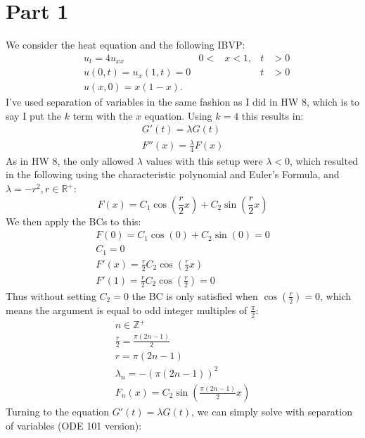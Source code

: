 \documentclass{article}
\begin{document}
\section*{Part 1}
We consider the heat equation and the following IBVP:
\begin{align*}
&u_t=4u_{xx} & 0<&x<1, & t&> 0\\
&u(0, t)= u_x(1, t) = 0 && & t&> 0\\
&u(x,0)= x(1-x). && &&
\end{align*}
I've used separation of variables in the same fashion as I did in HW 8, which is to say I put the $k$ term with the $x$ equation. Using $k = 4$ this results in:
\begin{equation}
\begin{aligned}
G'(t) = \lambda G(t)\\
F''(x) = \frac{\lambda}{4}F(x)
\end{aligned}
\end{equation}
As in HW 8, the only allowed $\lambda$ values with this setup were $\lambda < 0$, which resulted in the following using the characteristic polynomial and Euler's Formula, and $\lambda = -r^2, r \in \mathbb{R}^+$:
\begin{equation}
F(x) = C_1\cos(\frac{r}{2}x) + C_2\sin(\frac{r}{2}x)
\end{equation}
We then apply the BCs to this:
\begin{equation}
\begin{aligned}
F(0) = C_1\cos(0) + C_2\sin(0) = 0\\
C_1 = 0\\
F'(x) = \frac{r}{2}C_2\cos(\frac{r}{2}x)\\
F'(1) = \frac{r}{2}C_2\cos(\frac{r}{2}) = 0
\end{aligned}
\end{equation}
Thus without setting $C_2 = 0$ the BC is only satisfied when $\cos(\frac{r}{2}) = 0$, which means the argument is equal to odd integer multiples of $\frac{\pi}{2}$:
\begin{equation}
\begin{aligned}
n \in \mathbb{Z}^+\\
\frac{r}{2} = \frac{\pi (2n-1)}{2}\\
r = \pi (2n-1)\\
\lambda_n = - ( \pi(2n-1))^2\\
F_n(x) = C_2\sin(\frac{\pi(2n-1)}{2}x)
\end{aligned}
\end{equation}
Turning to the equation $G'(t) = \lambda G(t)$, we can simply solve with separation of variables (ODE 101 version):
\end{document}
